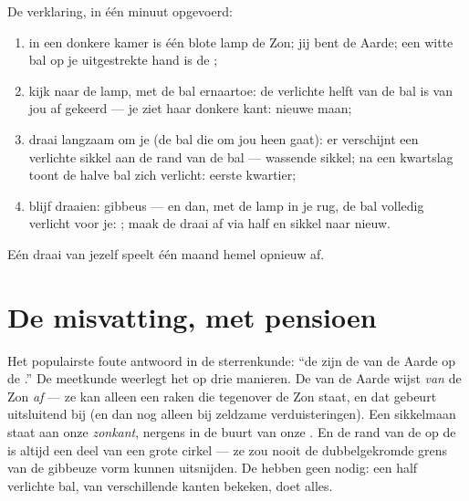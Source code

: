 \begin{method}\label{met:g7:moon-phases:walk}
De verklaring, in één minuut opgevoerd:
\begin{enumerate}
  \item in een donkere kamer is één blote lamp de Zon; jij bent de
        Aarde; een witte bal op je uitgestrekte hand is de
        ;
  \item kijk naar de lamp, met de bal ernaartoe: de verlichte helft
        van de bal is van jou af gekeerd --- je ziet haar donkere
        kant: nieuwe maan;
  \item draai langzaam om je  (de bal die om jou heen gaat): er
        verschijnt een verlichte sikkel aan de rand van de bal ---
        wassende sikkel; na een kwartslag toont de halve bal
        zich verlicht: eerste kwartier;
  \item blijf draaien: gibbeus --- en dan, met de lamp in je rug, de
        bal volledig verlicht voor je: ; maak de draai af
        via  half en sikkel naar nieuw.
\end{enumerate}
Eén draai van jezelf speelt één maand hemel opnieuw af.
\end{method}

\section{De misvatting, met pensioen}

\begin{proposition}\label{prop:g7:moon-phases:notshadow}
Het populairste foute antwoord in de sterrenkunde: ``de
 zijn de  van de Aarde op de .'' De
meetkunde weerlegt het op drie manieren. De  van de Aarde
wijst \emph{van} de Zon \emph{af} --- ze kan alleen een  raken
die tegenover de Zon staat, en dat gebeurt uitsluitend bij
 (en dan nog alleen bij zeldzame verduisteringen). Een
sikkelmaan staat aan onze \emph{zonkant}, nergens in de buurt van
onze . En de rand van de  op de  is altijd
een deel van een grote cirkel --- ze zou nooit de dubbelgekromde grens
van de gibbeuze vorm kunnen uitsnijden. De  hebben
geen  nodig: een half verlichte bal, van verschillende kanten
bekeken, doet alles.
\end{proposition}

